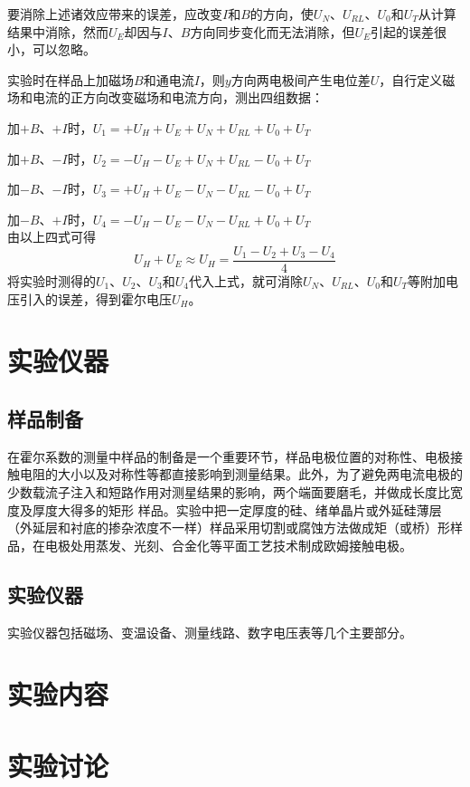\documentclass[a4paper]{article}
\begin{document}
要消除上述诸效应带来的误差，应改变$I$和$B$的方向，使$U_N$、$U_{RL}$、$U_0$和$U_T$从计算结果中消除，然而$U_E$却因与$I$、$B$方向同步变化而无法消除，但$U_E$引起的误差很小，可以忽略。

实验时在样品上加磁场$B$和通电流$I$，则$y$方向两电极间产生电位差$U$，自行定义磁场和电流的正方向改变磁场和电流方向，测出四组数据：

加$+B$、$+I$时，$U_1=+U_H+U_E+U_N+U_{RL}+U_0+U_T$

加$+B$、$-I$时，$U_2=-U_H-U_E+U_N+U_{RL}-U_0+U_T$

加$-B$、$-I$时，$U_3=+U_H+U_E-U_N-U_{RL}-U_0+U_T$

加$-B$、$+I$时，$U_4=-U_H-U_E-U_N-U_{RL}+U_0+U_T$\\
由以上四式可得
\begin{equation}\label{6.1.17}
U_H+U_E\approx U_H=\frac{U_1-U_2+U_3-U_4}{4}
\end{equation}
将实验时测得的$U_1$、$U_2$、$U_3$和$U_4$代入上式，就可消除$U_N$、$U_{RL}$、$U_0$和$U_T$等附加电压引入的误差，得到霍尔电压$U_H$。


\section{实验仪器}
\subsection{样品制备}
在霍尔系数的测量中样品的制备是一个重要环节，样品电极位置的对称性、电极接触电阻的大小以及对称性等都直接影响到测量结果。此外，为了避免两电流电极的少数载流子注入和短路作用对测星结果的影响，两个端面要磨毛，并做成长度比宽度及厚度大得多的矩形 样品。实验中把一定厚度的硅、绪单晶片或外延硅薄层（外延层和衬底的掺杂浓度不一样）样品采用切割或腐蚀方法做成矩（或桥）形样品，在电极处用蒸发、光刻、合金化等平面工艺技术制成欧姆接触电极。

\subsection{实验仪器}
实验仪器包括磁场、变温设备、测量线路、数字电压表等几个主要部分。

\section{实验内容}


\section{实验讨论}
\end{document}
